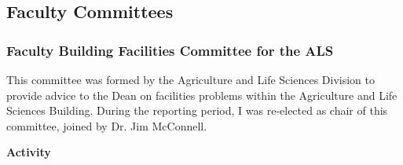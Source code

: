 \begin{comment}
\raggedright\vspace{2mm}\textbf{Activity}
\begin{itemize}
\item According to the UOG Registrar, I taught 4 courses during the Fanuchanan
semester: AL345, AL345L, BI345, and BI345L. In reality this was a
single course, AL/BI 345 \emph{General Entomology} consisting of two,
one and a half hour lectures and one three hour lab per week. 
\begin{itemize}
\item I built and maintained a web site for this course \cite{moore2017website}
\item In student evaluations for AL345, AL345L, BI345, and BI345L, my scores
were consistently higher than the University and College average \cite{moore2018student}.
\end{itemize}
\item I acted as the major faculty advisor for Mr. Ian Iriarte who is pursuing
a Master's degree in Environmental Science.
\end{itemize}
\raggedright\vspace{2mm}\textbf{Reference(s)}

\begin{btSect}[vancouver]{zotero}
\btPrintCited
\end{btSect}
\newpage{}
\end{btUnit}

\begin{btUnit}
\end{comment}

\subsection{Faculty Committees}

\subsubsection{Faculty Building Facilities Committee for the ALS}

This committee was formed by the Agriculture and Life Sciences Division
to provide advice to the Dean on facilities problems within the Agriculture
and Life Sciences Building. During the reporting period, I was re-elected
as chair of this committee, joined by Dr. Jim McConnell.

\raggedright\vspace{2mm}\textbf{Activity}
	
